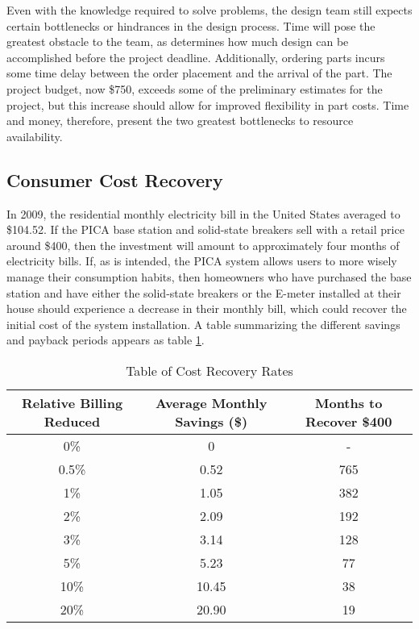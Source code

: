 Even with the knowledge required to solve problems, the design team still expects certain bottlenecks or hindrances in the design process. Time will pose the greatest obstacle to the team, as determines how much design can be accomplished before the project deadline. Additionally, ordering parts incurs some time delay between the order placement and the arrival of the part. The project budget, now \$750, exceeds some of the preliminary estimates for the project, but this increase should allow for improved flexibility in part costs. Time and money, therefore, present the two greatest bottlenecks to resource availability.

\subsection{Consumer Cost Recovery} %
In 2009, the residential monthly electricity bill in the United States averaged to \$104.52\cite{DOE-EIA}. If the PICA base station and solid-state breakers sell with a retail price around \$400, then the investment will amount to approximately four months of electricity bills. If, as is intended, the PICA system allows users to more wisely manage their consumption habits, then homeowners who have purchased the base station and have either the solid-state breakers or the E-meter installed at their house should experience a decrease in their monthly bill, which could recover the initial cost of the system installation. A table summarizing the different savings and payback periods appears as table \ref{tab:cost-recoup}.

\begin{table}[htbp]
 \caption{Table of Cost Recovery Rates} \label{tab:cost-recoup}
 \begin{center}
 \begin{tabular}{|c|c|c|} \hline
 \rowcolor{lightgray}
 Relative Billing Reduced & Average Monthly Savings (\$) & Months to Recover \$400 \\ \hline
 0\% & 0 & - \\ \hline
 0.5\% & 0.52 & 765 \\ \hline
 1\% & 1.05 & 382 \\ \hline
 2\% & 2.09 & 192 \\ \hline
 3\% & 3.14 & 128 \\ \hline
 5\% & 5.23 & 77 \\ \hline
 10\% & 10.45 & 38 \\ \hline
 20\% & 20.90 & 19 \\ \hline
 \end{tabular}
 \end{center}
\end{table}

